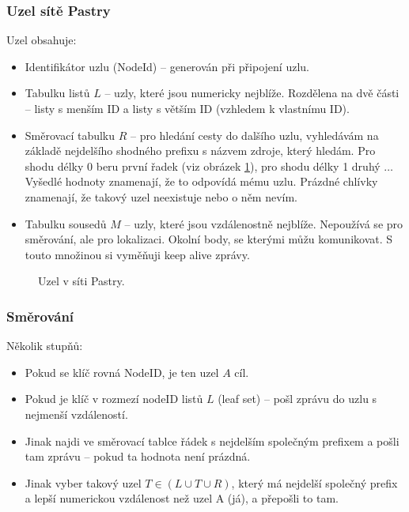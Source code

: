 \documentclass[11pt,a4paper]{article}
\begin{document}
\subsubsection*{Uzel sítě Pastry}
Uzel obsahuje:
\begin{itemize}
\item Identifikátor uzlu (NodeId) -- generován při připojení uzlu.
\item Tabulku listů $L$ -- uzly, které jsou numericky nejblíže. Rozdělena na dvě části -- listy s menším ID a listy s větším ID (vzhledem k vlastnímu ID).
\item Směrovací tabulku $R$ -- pro hledání cesty do dalšího uzlu, vyhledávám na základě nejdelšího shodného prefixu s názvem zdroje, který hledám. Pro shodu délky 0 beru první řadek (viz obrázek \ref{pastry_node}), pro shodu délky 1 druhý $\ldots$ Vyšedlé hodnoty znamenají, že to odpovídá mému uzlu. Prázdné chlívky znamenají, že takový uzel neexistuje nebo o něm nevím.
\item Tabulku sousedů $M$ -- uzly, které jsou vzdálenostně nejblíže. Nepoužívá se pro směrování, ale pro lokalizaci. Okolní body, se kterými můžu komunikovat. S touto množinou si vyměňuji keep alive zprávy.
\end{itemize}
\begin{figure}[ht!]
\begin{center}
\caption{Uzel v síti Pastry.}
\label{pastry_node}
\end{center}
\end{figure}

\subsubsection*{Směrování}
Několik stupňů:
\begin{itemize}
\item Pokud se klíč rovná NodeID, je ten uzel $A$ cíl.
\item Pokud je klíč v rozmezí nodeID listů $L$ (leaf set) -- pošl zprávu do uzlu s nejmenší vzdáleností.
\item Jinak najdi ve směrovací tablce řádek s nejdelším společným prefixem a pošli tam zprávu -- pokud ta hodnota není prázdná.
\item Jinak vyber takový uzel $T \in (L \cup T \cup R)$, který má nejdelší společný prefix a lepší numerickou vzdálenost než uzel A (já), a přepošli to tam.
\end{itemize}
\end{document}
